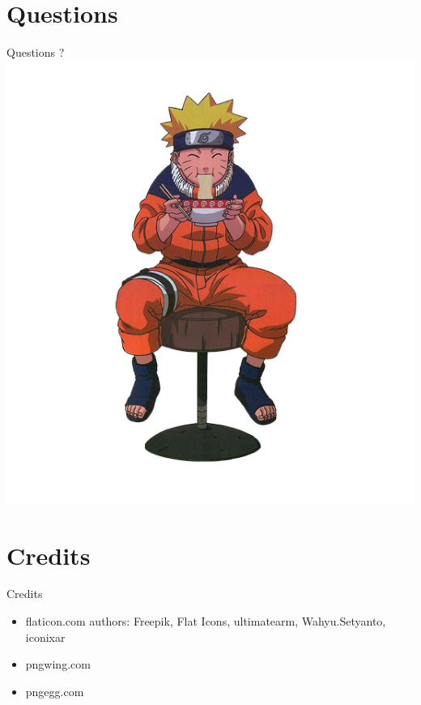 \documentclass{beamer}
\begin{document}
\section{Questions}
\begin{frame}{Questions ?}
    \centering
    \includegraphics[width=0.7\linewidth]{img/naruto_ramen.png}
\end{frame}

\section{Credits}
\begin{frame}{Credits}
    \begin{itemize}
        \item flaticon.com authors: Freepik, Flat Icons, ultimatearm, Wahyu.Setyanto, iconixar 
        \item pngwing.com
        \item pngegg.com
    \end{itemize}
\end{frame}
\end{document}
